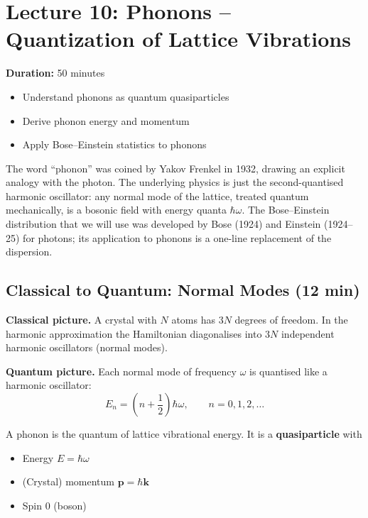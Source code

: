\documentclass[11pt,a4paper]{article}
\newcommand{\lecheader}[3]{%
  \section{Lecture #1: #2}
  \noindent\textbf{Duration:} #3\par\vspace{4pt}
}
\begin{document}
\newpage
\lecheader{10}{Phonons -- Quantization of Lattice Vibrations}{50 minutes}

\begin{keybox}
\begin{itemize}
\item Understand phonons as quantum quasiparticles
\item Derive phonon energy and momentum
\item Apply Bose--Einstein statistics to phonons
\end{itemize}
\end{keybox}

\begin{histbox}
The word ``phonon'' was coined by Yakov Frenkel in 1932, drawing an explicit
analogy with the photon. The underlying physics is just the second-quantised
harmonic oscillator: any normal mode of the lattice, treated quantum mechanically,
is a bosonic field with energy quanta $\hbar\omega$. The Bose--Einstein distribution
that we will use was developed by Bose (1924) and Einstein (1924--25) for photons;
its application to phonons is a one-line replacement of the dispersion.
\end{histbox}

\subsection{Classical to Quantum: Normal Modes \hfill \small(12 min)}

\textbf{Classical picture.} A crystal with $N$ atoms has $3N$ degrees of freedom. In
the harmonic approximation the Hamiltonian diagonalises into $3N$ independent
harmonic oscillators (normal modes).

\textbf{Quantum picture.} Each normal mode of frequency $\omega$ is quantised like a
harmonic oscillator:
\[
E_n = \left(n+\frac12\right)\hbar\omega, \qquad n=0,1,2,\dots
\]

\begin{keybox}
A phonon is the quantum of lattice vibrational energy. It is a \textbf{quasiparticle}
with
\begin{itemize}
\item Energy $E=\hbar\omega$
\item (Crystal) momentum $\mathbf p = \hbar\mathbf k$
\item Spin $0$ (boson)
\end{itemize}
\end{keybox}
\end{document}
